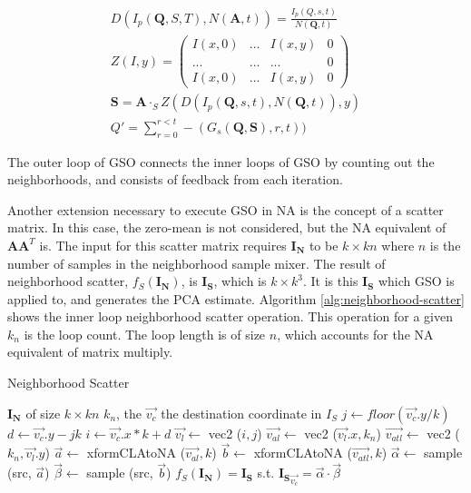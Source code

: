 \documentclass[11pt]{article}
\begin{document}
\begin{eqnarray}
D(I_p(\mathbf{Q},S,T), N(\mathbf{A},t) ) = \frac{I_p(Q,s,t)} {N(\mathbf{Q},t)} \label{gsoDivision}\\
Z(I, y)  = 
\left(
\begin{array}{llll}
 I(x,0) & ...  &  I(x,y) & 0 \\
 ... &  ... &   ... &  0\\
I(x,0)  &...   &   I(x,y) & 0
\end{array}
\right) \\
\mathbf{S} = \mathbf{A} \cdot_S Z(D(I_p(\mathbf{Q},s,t), N(\mathbf{Q},t) ) , y)  \\
Q' = \sum_{r=0}^{r<t} -(G_s (\mathbf{Q}, \mathbf{S}), r, t )) \label{gsoSubtract}
\end{eqnarray}

The outer loop of GSO connects the inner loops of GSO by counting out the neighborhoods, and consists of feedback from each iteration.  

Another extension necessary to execute GSO in NA is the concept of a scatter matrix.  In this case, the zero-mean is not considered, but the NA equivalent of $\mathbf{A}\mathbf{A}^T$ is.   The input for this scatter matrix requires $\mathbf{I_N}$ to be $k \times kn$ where $n$ is the number of samples in the neighborhood sample mixer. The result of neighborhood scatter, $f_S (\mathbf{I_N})$, is $\mathbf{I_S}$, which is $k \times k^3$.  It is this $\mathbf{I_S}$ which GSO is applied to, and generates the PCA estimate.  Algorithm \ref{alg:neighborhood-scatter} shows the inner loop neighborhood scatter operation.  This operation for a given $k_n$ is the loop count.  The loop length is of size $n$, which accounts for the NA equivalent of matrix multiply.  

\begin{algorithm}
\caption{Neighborhood Scatter}
\label{alg:neighborhood-scatter}
\begin{algorithmic}
	\REQUIRE $\mathbf{I_N}$ of size $k \times kn$
	\REQUIRE $k_n$, the 
	\REQUIRE $\vec{v_c}$ the destination coordinate in $I_S$
	\STATE $j \leftarrow floor(\vec{v_c}.y / k)$
	\STATE  $d \leftarrow \vec{v_c}.y - j k$
	\STATE $i \leftarrow \vec{v_c}.x * k + d $
	\STATE $\vec{v_l} \leftarrow$ vec2 ($i,j$)
	\STATE $\vec{v_{al}} \leftarrow$ vec2 ($\vec{v_l}.x, k_n$)
	\STATE $\vec{v_{atl}} \leftarrow$ vec2 ($k_n, \vec{v_l}.y$)
	\STATE $\vec{a} \leftarrow$ xformCLAtoNA ($\vec{v_{al}} , k$)
	\STATE $\vec{b} \leftarrow$ xformCLAtoNA ($\vec{v_{atl}} , k$)
	\STATE $\vec{\alpha} \leftarrow$ sample (src, $\vec{a}$)
	\STATE $\vec{\beta} \leftarrow$ sample (src, $\vec{b}$)
	\ENSURE $f_S(\mathbf{I_N}) = \mathbf{I_S}$ s.t. $\mathbf{I_S}_{\vec{v_c}} = \vec{\alpha} \cdot \vec{\beta}$
\end{algorithmic}
\end{algorithm}
\end{document}
